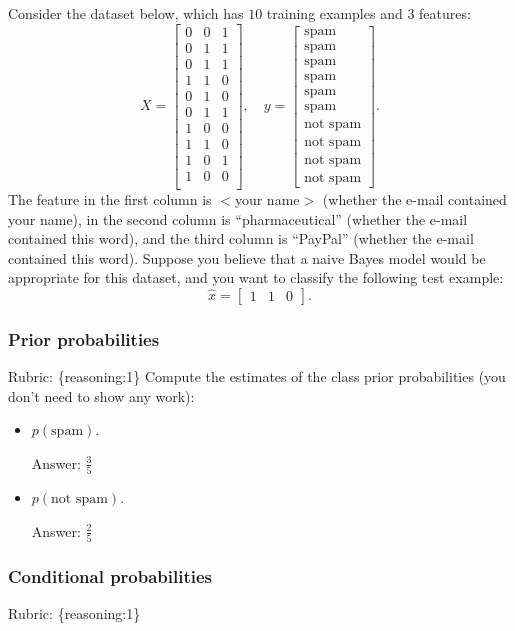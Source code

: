\documentclass{article}
\def\rubric#1{\gre{Rubric: \{#1\}}}{}
\def\ans#1{\par\gre{Answer: #1}}
\def\blu#1{{\color{blu}#1}}
\def\gre#1{{\color{gre}#1}}
\def\items#1{\begin{itemize}#1\end{itemize}}
\begin{document}
Consider the dataset below, which has $10$ training examples and $3$ features:
\[
X = \begin{bmatrix}0 & 0 & 1\\0 & 1 & 1\\ 0 & 1 & 1\\ 1 & 1 & 0\\0 & 1 & 0\\0 & 1 & 1\\1 & 0 & 0\\1 & 1 & 0\\1 & 0 & 1\\1 & 0 & 0\\\end{bmatrix}, \quad y = \begin{bmatrix}\text{spam}\\\text{spam}\\\text{spam}\\\text{spam}\\\text{spam}\\\text{spam}\\\text{not spam}\\\text{not spam}\\\text{not spam}\\\text{not spam}\end{bmatrix}.
\]
The feature in the first column is $<$your name$>$ (whether the e-mail contained your name), in the second column is ``pharmaceutical'' (whether the e-mail contained this word), and the third column is ``PayPal'' (whether the e-mail contained this word).
Suppose you believe that a naive Bayes model would be appropriate for this dataset, and you want to classify the following test example:
\[
\hat{x} = \begin{bmatrix}1 & 1 & 0\end{bmatrix}.
\]

\subsubsection{Prior probabilities}
\rubric{reasoning:1}
\blu{Compute the estimates of the class prior probabilities} (you don't need to show any work):
\items{
\item$ p(\text{spam})$.
\ans{$\frac{3}{5}$}
\item $p(\text{not spam})$.
\ans{$\frac{2}{5}$}
}

\subsubsection{Conditional probabilities}
\rubric{reasoning:1}
\end{document}
